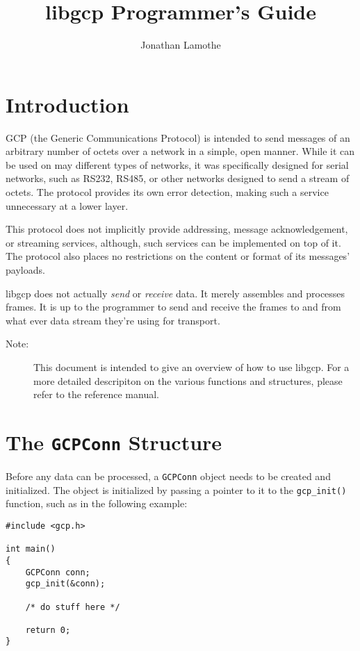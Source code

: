 \documentclass{article}
\title{libgcp Programmer's Guide}
\author{Jonathan Lamothe}
\begin{document}
\maketitle
\tableofcontents
\clearpage

\section{Introduction}
GCP (the Generic Communications Protocol) is intended to send messages
of an arbitrary number of octets over a network in a simple, open
manner.  While it can be used on may different types of networks, it
was specifically designed for serial networks, such as RS232, RS485,
or other networks designed to send a stream of octets.  The protocol
provides its own error detection, making such a service unnecessary at
a lower layer.

This protocol does not implicitly provide addressing, message
acknowledgement, or streaming services, although, such services can be
implemented on top of it.  The protocol also places no restrictions on
the content or format of its messages' payloads.

libgcp does not actually \emph{send} or \emph{receive} data.  It
merely assembles and processes frames.  It is up to the programmer to
send and receive the frames to and from what ever data stream they're
using for transport.

\begin{description}
\item[Note:]This document is intended to give an overview of how to
  use libgcp.  For a more detailed descripiton on the various
  functions and structures, please refer to the reference manual.
\end{description}

\section{The \texttt{GCPConn} Structure}
Before any data can be processed, a \texttt{GCPConn} object needs to
be created and initialized.  The object is initialized by passing a
pointer to it to the \texttt{gcp\_init()} function, such as in the
following example:
\begin{verbatim}
#include <gcp.h>

int main()
{
    GCPConn conn;
    gcp_init(&conn);

    /* do stuff here */

    return 0;
}
\end{verbatim}
\end{document}
